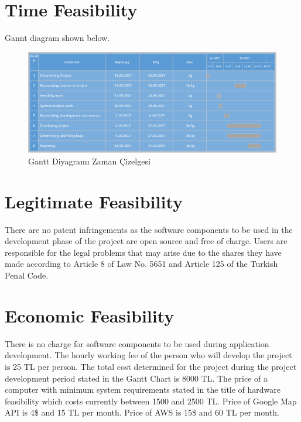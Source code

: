 \section{Time Feasibility}
Gannt diagram shown below.
\begin{figure}[!htbp]
\centering
\includegraphics[width=\textwidth]{projectChapters/images/gantt.png}
\caption{Gantt Diyagramı Zaman Çizelgesi}
\end{figure}


\section{Legitimate Feasibility}
There are no patent infringements as the software components to be used in the development phase of the project are open source and free of charge. Users are responsible for the legal problems that may arise due to the shares they have made according to Article 8 of Law No. 5651 and Article 125 of the Turkish Penal Code.


\section{Economic Feasibility}
There is no charge for software components to be used during application development. The hourly working fee of the person who will develop the project is 25 TL per person. The total cost determined for the project during the project development period stated in the Gantt Chart is 8000 TL. The price of a computer with minimum system requirements stated in the title of hardware feasibility which costs currently between 1500 and 2500 TL. Price of Google Map API is 4\$ and 15 TL per month. Price of AWS is 15\$ and 60 TL per month.

